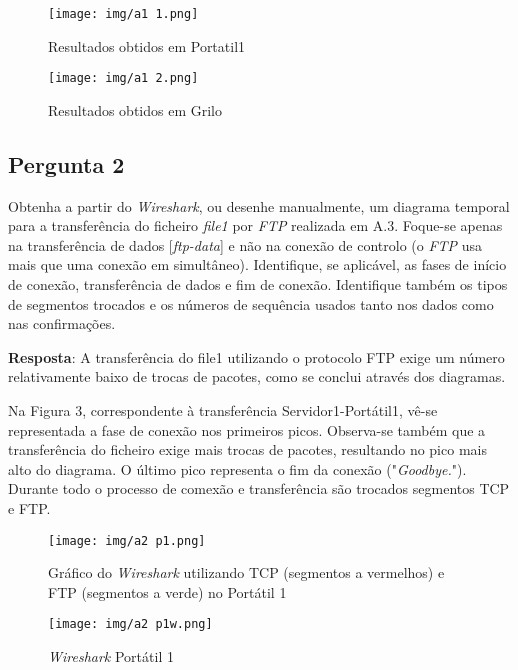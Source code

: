 \documentclass[runningheads]{llncs}
\begin{document}
    \begin{figure}[!ht]
    \centering
    \texttt{[image: img/a1 1.png]}
    \caption{Resultados obtidos em Portatil1} 
    \label{fig:data1}
    \end{figure}
    
    \begin{figure}[!ht]
    \centering
    \texttt{[image: img/a1 2.png]}
    \caption{Resultados obtidos em Grilo} 
    \label{fig:data2}
    \end{figure}
    
    \newpage
    
    \subsection{Pergunta 2}
    Obtenha a partir do \textit{Wireshark}, ou desenhe manualmente, um diagrama temporal para a transferência do ficheiro \textit{file1} por \textit{FTP} realizada em A.3. Foque-se apenas na transferência de dados [\textit{ftp-data}] e não na conexão de controlo (o \textit{FTP} usa mais que uma conexão em simultâneo). Identifique, se aplicável, as fases de início de conexão, transferência de dados e fim de conexão. Identifique também os tipos de segmentos trocados e os números de sequência usados tanto nos dados como nas confirmações.
    
    \textbf{Resposta}: A transferência do file1 utilizando o protocolo FTP exige um número relativamente baixo de trocas de pacotes, como se conclui através dos diagramas.
    
    Na Figura 3, correspondente à transferência Servidor1-Portátil1, vê-se representada a fase de conexão nos primeiros picos. Observa-se também que a transferência do ficheiro exige mais trocas de pacotes, resultando no pico mais alto do diagrama. O último pico representa o fim da conexão ("\textit{Goodbye.}"). Durante todo o processo de comexão e transferência são trocados segmentos TCP e FTP. 
    
    
    \begin{figure}[!ht]
    \centering
    \texttt{[image: img/a2 p1.png]}
    \caption{Gráfico do \textit{Wireshark} utilizando TCP (segmentos a vermelhos) e FTP (segmentos a verde) no Portátil 1} 
    \label{fig:data20}
    \end{figure}
    
    \begin{figure}[!ht]
    \centering
    \texttt{[image: img/a2 p1w.png]}
    \caption{\textit{Wireshark} Portátil 1} 
    \label{fig:data21}
    \end{figure}
    
\end{document}
